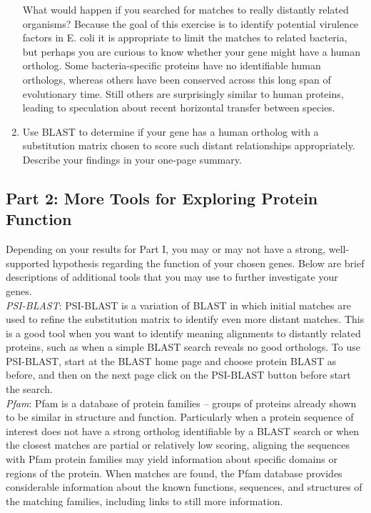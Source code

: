 \begin{enumerate}
What would happen if you searched for matches to really distantly related organisms?  Because the goal of this exercise is to identify potential virulence factors in E. coli it is appropriate to limit the matches to related bacteria, but perhaps you are curious to know whether your gene might have a human ortholog. Some bacteria-specific proteins have no identifiable human orthologs, whereas others have been conserved across this long span of evolutionary time.  Still others are surprisingly similar to human proteins, leading to speculation about recent horizontal transfer between species.  

	\item Use BLAST to determine if your gene has a human ortholog with a substitution matrix chosen to score such distant relationships appropriately.  Describe your findings in your one-page summary.

\end{enumerate}

\vspace*{-.1in}
\subsection*{Part 2: More Tools for Exploring Protein Function}
\vspace*{-.1in} 

Depending on your results for Part I, you may or may not have a strong, well-supported hypothesis regarding the function of your chosen genes.  Below are brief descriptions of additional tools that you may use to further investigate your genes.\\

\emph{PSI-BLAST}: PSI-BLAST is a variation of BLAST in which initial matches are used to refine the substitution matrix to identify even more distant matches.  This is a good tool when you want to identify meaning alignments to distantly related proteins, such as when a simple BLAST search reveals no good orthologs.  To use PSI-BLAST, start at the BLAST home page and choose protein BLAST as before, and then on the next page click on the PSI-BLAST button before start the search.\\

\emph{Pfam}: Pfam is a database of protein families – groups of proteins already shown to be similar in structure and function.  Particularly when a protein sequence of interest does not have a strong ortholog identifiable by a BLAST search or when the closest matches are partial or relatively low scoring, aligning the sequences with Pfam protein families may yield information about specific domains or regions of the protein.  When matches are found, the Pfam database provides considerable information about the known functions, sequences, and structures of the matching families, including links to still more information. \\

